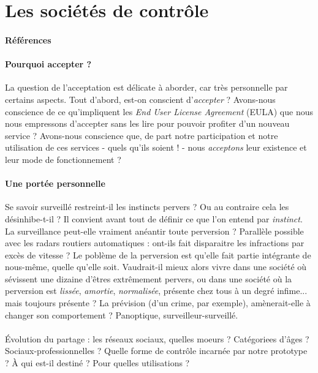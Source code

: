 \section{Les sociétés de contrôle}
\paragraph{Références} \cite{Huxley0} \cite{Orwell0} \cite{TechnoSocio1}

\paragraph{Pourquoi accepter ?} La question de l'acceptation est délicate à aborder, car
très personnelle par certains aspects. Tout d'abord, est-on conscient d'\emph{accepter} ?
Avons-nous conscience de ce qu'impliquent les \emph{End User License Agreement} (EULA) que
nous nous empressons d'accepter sans les lire pour pouvoir profiter d'un nouveau service ?
Avons-nous conscience que, de part notre participation et notre utilisation de ces services
- quels qu'ils soient ! - nous \emph{acceptons} leur existence et leur mode de fonctionnement ?

\paragraph{Une portée personnelle} Se savoir surveillé restreint-il les instincts pervers ?
Ou au contraire cela les désinhibe-t-il ? Il convient avant tout de définir ce que l'on
entend par \emph{instinct}. La surveillance peut-elle vraiment anéantir toute perversion ?
Parallèle possible avec les radars routiers automatiques : ont-ils fait disparaitre les
infractions par excès de vitesse ? Le poblème de la perversion est qu'elle fait partie
intégrante de nous-même, quelle qu'elle soit. Vaudrait-il mieux alors vivre dans une société
où sévissent une dizaine d'êtres extrêmement pervers, ou dans une société où la perversion
est \emph{lissée}, \emph{amortie}, \emph{normalisée}, présente chez tous à un degré infime...
mais toujours présente ? La prévision (d'un crime, par exemple), amènerait-elle à changer
son comportement ? Panoptique, surveilleur-surveillé. 

\paragraph{} Évolution du partage : les réseaux sociaux, quelles moeurs ? Catégoriees d'âges ? Sociaux-professionnelles ?
Quelle forme de contrôle incarnée par notre prototype ? À qui est-il destiné ? Pour quelles utilisations ?

